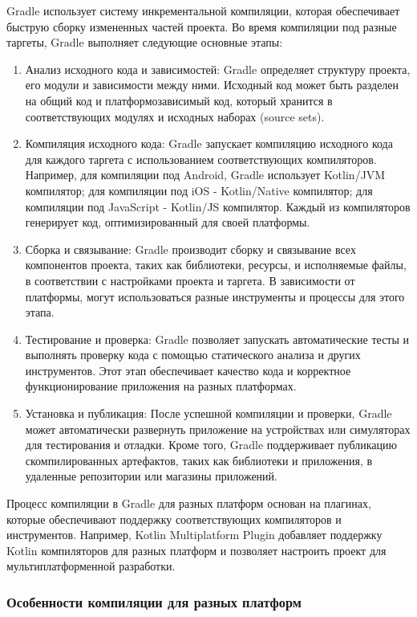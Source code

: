 \documentclass[14pt, russian]{scrartcl}
\begin{document}
Gradle использует систему инкрементальной компиляции, которая обеспечивает быструю сборку измененных частей проекта. Во время компиляции под разные таргеты, Gradle выполняет следующие основные этапы:

\begin{enumerate}
    \item Анализ исходного кода и зависимостей: Gradle определяет структуру проекта, его модули и зависимости между ними. Исходный код может быть разделен на общий код и платформозависимый код, который хранится в соответствующих модулях и исходных наборах (source sets).
    \item Компиляция исходного кода: Gradle запускает компиляцию исходного кода для каждого таргета с использованием соответствующих компиляторов. Например, для компиляции под Android, Gradle использует Kotlin/JVM компилятор; для компиляции под iOS - Kotlin/Native компилятор; для компиляции под JavaScript - Kotlin/JS компилятор. Каждый из компиляторов генерирует код, оптимизированный для своей платформы.
    \item Сборка и связывание: Gradle производит сборку и связывание всех компонентов проекта, таких как библиотеки, ресурсы, и исполняемые файлы, в соответствии с настройками проекта и таргета. В зависимости от платформы, могут использоваться разные инструменты и процессы для этого этапа.
    \item Тестирование и проверка: Gradle позволяет запускать автоматические тесты и выполнять проверку кода с помощью статического анализа и других инструментов. Этот этап обеспечивает качество кода и корректное функционирование приложения на разных платформах.
    \item Установка и публикация: После успешной компиляции и проверки, Gradle может автоматически развернуть приложение на устройствах или симуляторах для тестирования и отладки. Кроме того, Gradle поддерживает публикацию скомпилированных артефактов, таких как библиотеки и приложения, в удаленные репозитории или магазины приложений.
\end{enumerate}

Процесс компиляции в Gradle для разных платформ основан на плагинах, которые обеспечивают поддержку соответствующих компиляторов и инструментов. Например, Kotlin Multiplatform Plugin добавляет поддержку Kotlin компиляторов для разных платформ и позволяет настроить проект для мультиплатформенной разработки.

\subsubsection{Особенности компиляции для разных платформ}
\end{document}

